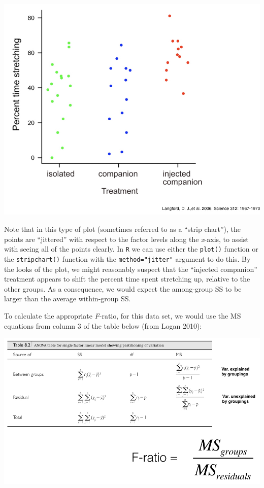 \documentclass[
]{book}
\begin{document}
\begin{center}\includegraphics[width=0.8\linewidth]{images/images_5b.014} \end{center}

Note that in this type of plot (sometimes referred to as a ``strip chart''), the points are ``jittered'' with respect to the factor levels along the \emph{x}-axis, to assist with seeing all of the points clearly. In \texttt{R} we can use either the \texttt{plot()} function or the \texttt{stripchart()} function with the \texttt{method="jitter"} argument to do this. By the looks of the plot, we might reasonably suspect that the ``injected companion'' treatment appears to shift the percent time spent stretching up, relative to the other groups. As a consequence, we would expect the among-group SS to be larger than the average within-group SS.

To calculate the appropriate \emph{F}-ratio, for this data set, we would use the MS equations from column 3 of the table below (from Logan 2010):

\begin{center}\includegraphics[width=1\linewidth]{images/images_5b.018} \end{center}
\end{document}
